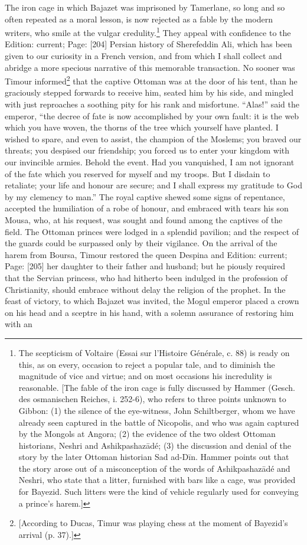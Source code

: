 The iron cage in which Bajazet was imprisoned by Tamerlane, so long and so often repeated as a moral lesson, is now rejected as a fable by the modern writers, who smile at the vulgar credulity.\footnote{The scepticism of Voltaire (Essai sur l\texthebrew{}’Histoire Générale, c. 88) is ready on this, as on every, occasion to reject a popular tale, and to diminish the magnitude of vice and virtue; and on most occasions his incredulity is reasonable. [The fable of the iron cage is fully discussed by Hammer (Gesch. des osmanischen Reiches, i. 252-6), who refers to three points unknown to Gibbon: (1) the silence of the eye-witness, John Schiltberger, whom we have already seen captured in the battle of Nicopolis, and who was again captured by the Mongols at Angora; (2) the evidence of the two oldest Ottoman historians, Neshri and Ashikpashazādé; (3) the discussion and denial of the story by the later Ottoman historian Sad ad-Dīn. Hammer points out that the story arose out of a misconception of the words of Ashikpashazādé and Neshri, who state that a litter, furnished with bars like a cage, was provided for Bayezid. Such litters were the kind of vehicle regularly used for conveying a prince\texthebrew{}’s harem.]} They appeal with confidence to the Edition: current; Page: [204] Persian history of Sherefeddin Ali, which has been given to our curiosity in a French version, and from which I shall collect and abridge a more specious narrative of this memorable transaction. No sooner was Timour informed\footnote{[According to Ducas, Timur was playing chess at the moment of Bayezid\texthebrew{}’s arrival (p. 37).]} that the captive Ottoman was at the door of his tent, than he graciously stepped forwards to receive him, seated him by his side, and mingled with just reproaches a soothing pity for his rank and misfortune. \texthebrew{“}Alas!\texthebrew{}” said the emperor, \texthebrew{“}the decree of fate is now accomplished by your own fault: it is the web which you have woven, the thorns of the tree which yourself have planted. I wished to spare, and even to assist, the champion of the Moslems; you braved our threats; you despised our friendship; you forced us to enter your kingdom with our invincible armies. Behold the event. Had you vanquished, I am not ignorant of the fate which you reserved for myself and my troops. But I disdain to retaliate; your life and honour are secure; and I shall express my gratitude to God by my clemency to man.\texthebrew{}” The royal captive shewed some signs of repentance, accepted the humiliation of a robe of honour, and embraced with tears his son Mousa, who, at his request, was sought and found among the captives of the field. The Ottoman princes were lodged in a splendid pavilion; and the respect of the guards could be surpassed only by their vigilance. On the arrival of the harem from Boursa, Timour restored the queen Despina and Edition: current; Page: [205] her daughter to their father and husband; but he piously required that the Servian princess, who had hitherto been indulged in the profession of Christianity, should embrace without delay the religion of the prophet. In the feast of victory, to which Bajazet was invited, the Mogul emperor placed a crown on his head and a sceptre in his hand, with a solemn assurance of restoring him with an 